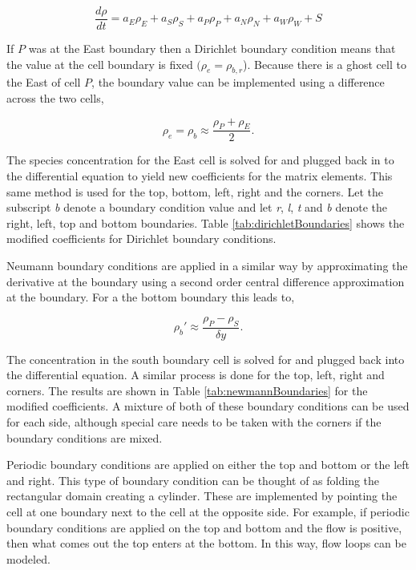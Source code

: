 \begin{equation}
    \frac{d\rho}{dt} = a_{E}\rho_{E} + a_{S}\rho_{S} + a_{P}\rho_{P} + a_{N}\rho_{N} + a_{W}\rho_{W} + S
\end{equation}

\noindent If $P$ was at the East boundary then a Dirichlet boundary condition means that the value at the cell boundary is fixed $(\rho_{e} = \rho_{b,r}$). Because there is a ghost cell to the East of cell $P$, the boundary value can be implemented using a difference across the two cells,

\begin{equation}
    \rho_{e} = \rho_{b} \approx \frac{\rho_{P} + \rho_{E}}{2}.
\end{equation}

\noindent The species concentration for the East cell is solved for and plugged back in to the differential equation to yield new coefficients for the matrix elements. This same method is used for the top, bottom, left, right and the corners. Let the subscript \textit{b} denote a boundary condition value and let \textit{r}, \textit{l}, \textit{t} and \textit{b} denote the right, left, top and bottom boundaries. Table \ref{tab:dirichletBoundaries} shows the modified coefficients for Dirichlet boundary conditions. 

Neumann boundary conditions are applied in a similar way by approximating the derivative at the boundary using a second order central difference approximation at the boundary. For a the bottom boundary this leads to,

\begin{equation}
    \rho_{b}' \approx \frac{\rho_{P} - \rho_{S}}{\delta y}.
\end{equation}

\noindent The concentration in the south boundary cell is solved for and plugged back into the differential equation. A similar process is done for the top, left, right and corners. The results are shown in Table \ref{tab:newmannBoundaries} for the modified coefficients. A mixture of both of these boundary conditions can be used for each side, although special care needs to be taken with the corners if the boundary conditions are mixed. 

Periodic boundary conditions are applied on either the top and bottom or the left and right. This type of boundary condition can be thought of as folding the rectangular domain creating a cylinder. These are implemented by pointing the cell at one boundary next to the cell at the opposite side. For example, if periodic boundary conditions are applied on the top and bottom and the flow is positive, then what comes out the top enters at the bottom. In this way, flow loops can be modeled.

